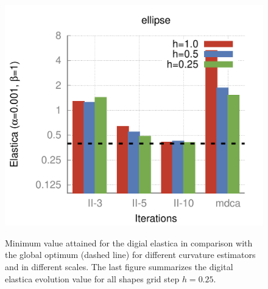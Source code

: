 \begin{figure}[]
{\includegraphics[scale=0.4]{figures/chapter5/flow/plots/bars/length_pen_0.00100/ellipse.pdf}
}\hspace{0.25em}%
%
\caption{ Minimum value attained for the digial elastica in comparison with the global optimum (dashed line) for different curvature estimators and in different scales. The last figure summarizes the digital elastica evolution value for all shapes   grid step $h=0.25$.}
\label{fig:local-comb-estimators-plots-lp0001}
\end{figure}


